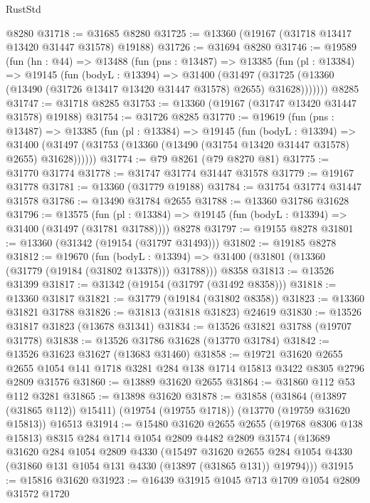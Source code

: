 \begin{lexlean}{RustStd}
\begin{coremodule}
    @8280
@31718 := @31685 @8280
@31725 := @13360 (@19167 (@31718 @13417 @13420 @31447 @31578) @19188)
@31726 := @31694 @8280
@31746 := @19589
    (fun (hn : @44) =>
    @13488
      (fun (pns : @13487) =>
      @13385
        (fun (pl : @13384) =>
        @19145
          (fun (bodyL : @13394) =>
          @31400
            (@31497
              (@31725 (@13360 (@13490 (@31726 @13417 @13420 @31447 @31578) @2655) @31628)))))))
    @8285
@31747 := @31718 @8285
@31753 := @13360 (@19167 (@31747 @13420 @31447 @31578) @19188)
@31754 := @31726 @8285
@31770 := @19619
    (fun (pns : @13487) =>
    @13385
      (fun (pl : @13384) =>
      @19145
        (fun (bodyL : @13394) =>
        @31400 (@31497 (@31753 (@13360 (@13490 (@31754 @13420 @31447 @31578) @2655) @31628))))))
@31774 := @79 @8261 (@79 @8270 @81)
@31775 := @31770 @31774
@31778 := @31747 @31774 @31447 @31578
@31779 := @19167 @31778
@31781 := @13360 (@31779 @19188)
@31784 := @31754 @31774 @31447 @31578
@31786 := @13490 @31784 @2655
@31788 := @13360 @31786 @31628
@31796 := @13575
    (fun (pl : @13384) => @19145 (fun (bodyL : @13394) => @31400 (@31497 (@31781 @31788))))
    @8278
@31797 := @19155 @8278
@31801 := @13360 (@31342 (@19154 (@31797 @31493)))
@31802 := @19185 @8278
@31812 := @19670
    (fun (bodyL : @13394) => @31400 (@31801 (@13360 (@31779 (@19184 (@31802 @13378))) @31788)))
    @8358
@31813 := @13526 @31399
@31817 := @31342 (@19154 (@31797 (@31492 @8358)))
@31818 := @13360 @31817
@31821 := @31779 (@19184 (@31802 @8358))
@31823 := @13360 @31821 @31788
@31826 := @31813 (@31818 @31823) @24619
@31830 := @13526 @31817 @31823 (@13678 @31341)
@31834 := @13526 @31821 @31788 (@19707 @31778)
@31838 := @13526 @31786 @31628 (@13770 @31784)
@31842 := @13526 @31623 @31627 (@13683 @31460)
@31858 := @19721
    @31620
    @2655
    @2655
    @1054
    @141
    @1718
    @3281
    @284
    @138
    @1714
    @15813
    @3422
    @8305
    @2796
    @2809
    @31576
@31860 := @13889 @31620 @2655
@31864 := @31860 @112 @53 @112 @3281
@31865 := @13898 @31620
@31878 := @31858
    (@31864 (@13897 (@31865 @112)) @15411)
    (@19754 (@19755 @1718))
    (@13770 (@19759 @31620 @15813))
    @16513
@31914 := @15480
    @31620
    @2655
    @2655
    (@19768 @8306 @138 @15813)
    @8315
    @284
    @1714
    @1054
    @2809
    @4482
    @2809
    @31574
    (@13689
      @31620
      @284
      @1054
      @2809
      @4330
      (@15497
        @31620
        @2655
        @284
        @1054
        @4330
        (@31860 @131 @1054 @131 @4330 (@13897 (@31865 @131)) @19794)))
@31915 := @15816 @31620
@31923 := @16439 @31915 @1045 @713 @1709 @1054 @2809 @31572 @1720

\end{coremodule}
\end{lexlean}
